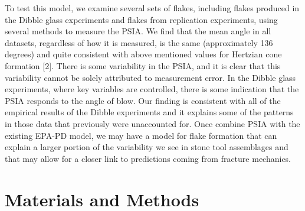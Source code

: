 \documentclass[10pt,letterpaper]{article}
\begin{document}
To test this model, we examine several sets of flakes, including flakes
produced in the Dibble glass experiments and flakes from replication
experiments, using several methods to measure the PSIA. We find that the
mean angle in all datasets, regardless of how it is measured, is the
same (approximately 136 degrees) and quite consistent with above
mentioned values for Hertzian cone formation {[}2{]}. There is some
variability in the PSIA, and it is clear that this variability cannot be
solely attributed to measurement error. In the Dibble glass experiments,
where key variables are controlled, there is some indication that the
PSIA responds to the angle of blow. Our finding is consistent with all
of the empirical results of the Dibble experiments and it explains some
of the patterns in those data that previously were unaccounted for. Once
combine PSIA with the existing EPA-PD model, we may have a model for
flake formation that can explain a larger portion of the variability we
see in stone tool assemblages and that may allow for a closer link to
predictions coming from fracture mechanics.

\hypertarget{materials-and-methods}{%
\section{Materials and Methods}\label{materials-and-methods}}
\end{document}
